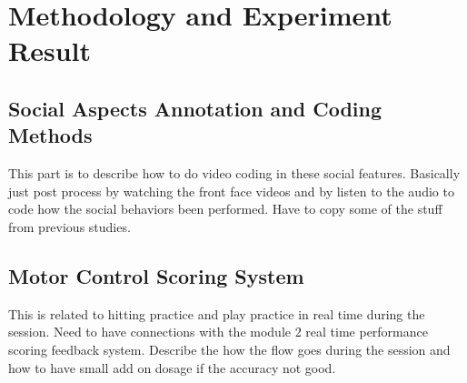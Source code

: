 
\section{Methodology and Experiment Result}

\subsection{Social Aspects Annotation and Coding Methods}
This part is to describe how to do video coding in these social features.
Basically just post process by watching the front face videos and by listen to the
audio to code how the social behaviors been performed. Have to copy some of the stuff
from previous studies.

\subsection{Motor Control Scoring System}
This is related to hitting practice and play practice in real time during the session.
Need to have connections with the module 2 real time performance scoring feedback system.
Describe the how the flow goes during the session and how to have small add on dosage
if the accuracy not good. \\

